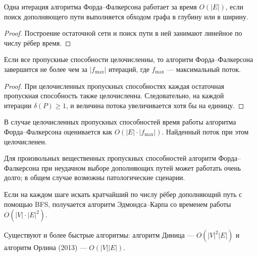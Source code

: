 \begin{Proposition}{}{}
	Одна итерация алгоритма Форда--Фалкерсона работает за время $O(|E|)$, если поиск дополняющего пути выполняется обходом графа в глубину или в ширину.
\end{Proposition}

\begin{proof}
	Построение остаточной сети и поиск пути в ней занимают линейное по числу рёбер время.
\end{proof}

\begin{Proposition}{}{}
	Если все пропускные способности целочисленны, то алгоритм Форда--Фалкерсона завершится не более чем за $|f_{\max}|$ итераций, где $f_{\max}$ --- максимальный поток.
\end{Proposition}

\begin{proof}
	При целочисленных пропускных способностях каждая остаточная пропускная способность также целочисленна. Следовательно, на каждой итерации $\delta(P)\ge 1$, и величина потока увеличивается хотя бы на единицу.
\end{proof}

\begin{Corollary}{}{}
	В случае целочисленных пропускных способностей время работы алгоритма Форда--Фалкерсона оценивается как $O(|E|\cdot |f_{\max}|)$. Найденный поток при этом целочисленен.
\end{Corollary}

\begin{Remark}{}{}
	Для произвольных вещественных пропускных способностей алгоритм Форда--Фалкерсона при неудачном выборе дополняющих путей может работать очень долго; в общем случае возможны патологические сценарии.
\end{Remark}

\begin{Statement}{}{}
	Если на каждом шаге искать кратчайший по числу рёбер дополняющий путь с помощью BFS, получается алгоритм Эдмондса--Карпа со временем работы $O(|V|\cdot |E|^2)$.
\end{Statement}

\begin{Remark}{}{}
	Существуют и более быстрые алгоритмы: алгоритм Диница --- $O(|V|^2|E|)$ и алгоритм Орлина (2013) --- $O(|V||E|)$.
\end{Remark}